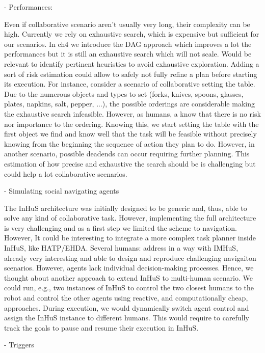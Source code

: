 - Performances:

Even if collaborative scenario aren't usually very long, their complexity can be high. 
Currently we rely on exhaustive search, which is expensive but sufficient for our scenarios. In ch4 we introduce the DAG approach which improves a lot the performances but it is still an exhaustive search which will not scale. 
Would be relevant to identify pertinent heuristics to avoid exhaustive exploration. Adding a sort of risk estimation could allow to safely not fully refine a plan before starting its execution. For instance, consider a scenario of collaborative setting the table. Due to the numerous objects and types to set (forks, knives, spoons, glasses, plates, napkins, salt, pepper, ...), the possible orderings are considerable making the exhaustive search infeasible. However, as humans, a know that there is no risk nor importance to the ordering. Knowing this, we start setting the table with the first object we find and know well that the task will be feasible without precisely knowing from the beginning the sequence of action they plan to do. However, in another scenario, possible deadends can occur requiring further planning. This estimation of how precise and exhaustive the search should be is challenging but could help a lot collaborative scenarios.

- Simulating social navigating agents

The InHuS architecture was initially designed to be generic and, thus, able to solve any kind of collaborative task. However, implementing the full architecture is very challenging and as a first step we limited the scheme to navigation. However, It could be interesting to integrate a more complex task planner inside InHuS, like HATP/EHDA.  
Several humans: address in a way with IMHuS, already very interesting and able to design and reproduce challenging navigaiton scenarios. However, agents lack individual decision-making processes. Hence, we thought about another approach to extend InHuS to multi-human scenario. We could run, e.g., two instances of InHuS to control the two closest humans to the robot and control the other agents using reactive, and computationally cheap, approaches. During execution, we would dynamically switch agent control and assign the InHuS instance to different humans. This would require to carefully track the goals to pause and resume their execution in InHuS. 



- Triggers

